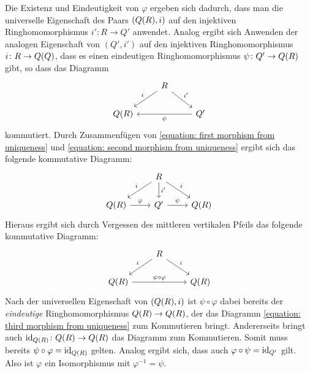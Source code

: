 \begin{remark}
  Die Existenz und Eindeutigkeit von $\varphi$ ergeben sich dadurch, dass man die universelle Eigenschaft des Paars $(Q(R), i)$ auf den injektiven Ringhomomorphismus $i' \colon R \to Q'$ anwendet.
  Analog ergibt sich Anwenden der analogen Eigenschaft von $(Q', i')$ auf den injektiven Ringhomomorphismus $i \colon R \to Q(Q)$, dass es einen eindeutigen Ringhomomorphismus $\psi \colon Q' \to Q(R)$ gibt, so dass das Diagramm
  \begin{equation}
    \label{equation: second morphism from uniqueness}
    \begin{tikzcd}
        {}
      & R
        \arrow[swap]{dl}{i}
        \arrow{dr}{i'}
      & {}
      \\
        \fraction{R}
      & {}
      & Q'
        \arrow{ll}{\psi}
    \end{tikzcd}
  \end{equation}
  kommutiert.
  Durch Zusammenfügen von \eqref{equation: first morphism from uniqueness} und \eqref{equation: second morphism from uniqueness} ergibt sich das folgende kommutative Diagramm:
  \begin{equation}
    \begin{tikzcd}
        {}
      & R
        \arrow[swap]{dl}{i}
        \arrow{d}{i'}
        \arrow{dr}{i}
      & {}
      \\
        \fraction{R}
        \arrow{r}{\varphi}
      & Q'
        \arrow{r}{\psi}
      & \fraction{R}
    \end{tikzcd}
  \end{equation}
  Hieraus ergibt sich durch Vergessen des mittleren vertikalen Pfeils das folgende kommutative Diagramm:
  \begin{equation}
    \label{equation: third morphism from uniqueness}
    \begin{tikzcd}
        {}
      & R
        \arrow[swap]{dl}{i}
        \arrow{dr}{i}
      & {}
      \\
        \fraction{R}
        \arrow{rr}{\psi \circ \varphi}
      & {}
      & \fraction{R}
    \end{tikzcd}
  \end{equation}
  Nach der universellen Eigenschaft von $(Q(R), i)$ ist $\psi \circ \varphi$ dabei bereits der \emph{eindeutige} Ringhomomorphismus $Q(R) \to Q(R)$, der das Diagramm \eqref{equation: third morphism from uniqueness} zum Kommutieren bringt.
  Andererseits bringt auch $\operatorname{id}_{Q(R)} \colon Q(R) \to Q(R)$ das Diagramm zum Kommutieren.
  Somit muss bereits $\psi \circ \varphi = \operatorname{id}_{Q(R)}$ gelten.
  Analog ergibt sich, dass auch $\varphi \circ \psi = \operatorname{id}_{Q'}$ gilt.
  Also ist $\varphi$ ein Isomorphismus mit $\varphi^{-1} = \psi$.
\end{remark}

























